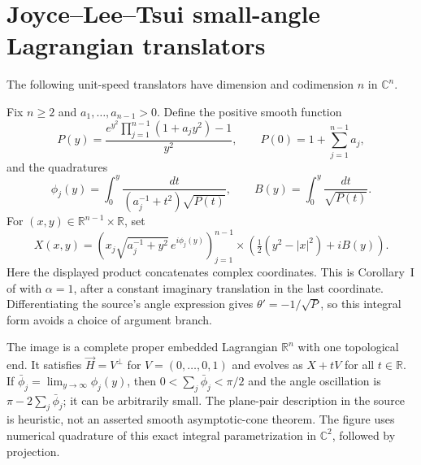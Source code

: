 \chapter{Joyce--Lee--Tsui small-angle Lagrangian translators}\label{sec:catalogue-jlt-translators}
The following unit-speed translators have dimension and codimension $n$ in $\mathbb C^n$.
\begin{example}\label{ex:catalogue-jlt-translators}
Fix $n\geq2$ and $a_1,\ldots,a_{n-1}>0$. Define the positive smooth function
\[
 P(y)=\frac{e^{y^2}\prod_{j=1}^{n-1}(1+a_jy^2)-1}{y^2},
 \qquad P(0)=1+\sum_{j=1}^{n-1}a_j,
\]
and the quadratures
\[
 \phi_j(y)=\int_0^y\frac{dt}{(a_j^{-1}+t^2)\sqrt{P(t)}},\qquad
 B(y)=\int_0^y\frac{dt}{\sqrt{P(t)}}.
\]
For $(x,y)\in\mathbb R^{n-1}\times\mathbb R$, set
\[
 X(x,y)=\left(x_j\sqrt{a_j^{-1}+y^2}\,e^{i\phi_j(y)}\right)_{j=1}^{n-1}
 \mathbin{\times}\left(\tfrac12(y^2-|x|^2)+iB(y)\right).
\]
Here the displayed product concatenates complex coordinates. This is Corollary~I of \cite{CatJoyceLeeTsui2010} with $\alpha=1$, after a constant imaginary translation in the last coordinate. Differentiating the source's angle expression gives $\theta'=-1/\sqrt P$, so this integral form avoids a choice of argument branch.

The image is a complete proper embedded Lagrangian $\mathbb R^n$ with one topological end. It satisfies $\vec H=V^\perp$ for $V=(0,\ldots,0,1)$ and evolves as $X+tV$ for all $t\in\mathbb R$. If $\bar\phi_j=\lim_{y\to\infty}\phi_j(y)$, then $0<\sum_j\bar\phi_j<\pi/2$ and the angle oscillation is $\pi-2\sum_j\bar\phi_j$; it can be arbitrarily small. The plane-pair description in the source is heuristic, not an asserted smooth asymptotic-cone theorem. The figure uses numerical quadrature of this exact integral parametrization in $\mathbb C^2$, followed by projection.
\end{example}

